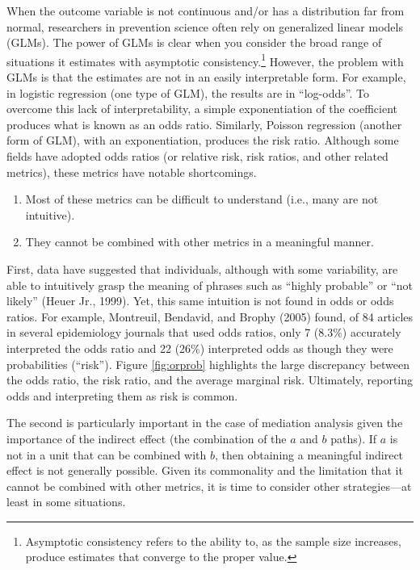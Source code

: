 \documentclass[]{DissertateUSU}
\let\rmarkdownfootnote\footnote%
\def\footnote{\protect\rmarkdownfootnote}
\begin{document}
When the outcome variable is not continuous and/or has a distribution
far from normal, researchers in prevention science often rely on
generalized linear models (GLMs). The power of GLMs is clear when you
consider the broad range of situations it estimates with asymptotic
consistency.\footnote{Asymptotic consistency refers to the ability to, as the sample size increases, produce estimates that converge to the proper value.}
However, the problem with GLMs is that the estimates are not in an
easily interpretable form. For example, in logistic regression (one type
of GLM), the results are in ``log-odds''. To overcome this lack of
interpretability, a simple exponentiation of the coefficient produces
what is known as an odds ratio. Similarly, Poisson regression (another
form of GLM), with an exponentiation, produces the risk ratio. Although
some fields have adopted odds ratios (or relative risk, risk ratios, and
other related metrics), these metrics have notable shortcomings.

\begin{enumerate}
\item Most of these metrics can be difficult to understand (i.e., many are not intuitive).
\item They cannot be combined with other metrics in a meaningful manner.
\end{enumerate}

First, data have suggested that individuals, although with some
variability, are able to intuitively grasp the meaning of phrases such
as ``highly probable'' or ``not likely'' (Heuer Jr., 1999). Yet, this
same intuition is not found in odds or odds ratios. For example,
Montreuil, Bendavid, and Brophy (2005) found, of 84 articles in several
epidemiology journals that used odds ratios, only 7 (8.3\%) accurately
interpreted the odds ratio and 22 (26\%) interpreted odds as though they
were probabilities (``risk''). Figure \ref{fig:orprob} highlights the
large discrepancy between the odds ratio, the risk ratio, and the
average marginal risk. Ultimately, reporting odds and interpreting them
as risk is common.

The second is particularly important in the case of mediation analysis
given the importance of the indirect effect (the combination of the
\(a\) and \(b\) paths). If \(a\) is not in a unit that can be combined
with \(b\), then obtaining a meaningful indirect effect is not generally
possible. Given its commonality and the limitation that it cannot be
combined with other metrics, it is time to consider other
strategies---at least in some situations.
\end{document}
